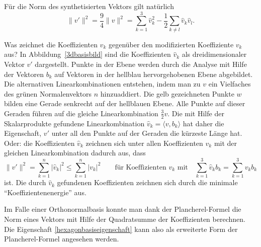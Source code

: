 Für die Norm des synthetisierten Vektors gilt natürlich
\[
\|v'\|^2
=
\frac94\|v\|^2
=
\sum_{k=1}^3 \hat{v}_k^2 
-
\frac12\sum_{k\ne l} \hat{v}_k\hat{v}_l.
\]

Was zeichnet die Koeffizienten $\hat{v}_k$ gegenüber den modifizierten
Koeffiziente $v_k$ aus?
In Abbildung~\ref{3dbasisbild} sind die Koeffizienten $\hat{v}_k$ als
dreidimensionaler Vektor $v'$ dargestellt.
Punkte in der Ebene werden durch die Analyse mit Hilfe der Vektoren $b_k$
auf Vektoren in der hellblau hervorgehobenen Ebene abgebildet.
Die alternativen Linearkombinationen entstehen, indem man zu $v$
ein Vielfaches des grünen Normalenvektors $n$ hinzuaddiert.
Die gelb gezeichneten Punkte $w$ bilden eine Gerade senkrecht
auf der hellblauen Ebene.
Alle Punkte auf dieser Geraden führen auf die gleiche
Linearkombination $\frac32v$.
Die mit Hilfe der Skalarprodukte gefundene Linearkombination
$\hat{v}_k=\langle v,b_k\rangle$ hat daher die Eigenschaft, 
$v'$ unter all den Punkte auf der Geraden die kürzeste Länge hat.
Oder: die Koeffizienten $\hat{v}_k$ zeichnen sich unter allen
Koeffizienten $v_k$ mit der gleichen Linearkombination dadurch aus, 
dass
\begin{equation}
\|v'\|^2
=
\sum_{k=1}^n |\hat{v}_k|^2
\le
\sum_{k=1}^n |v_k|^2
\qquad
\text{für Koeffizienten $v_k$ mit}
\quad
\sum_{k=1}^3 \hat{v}_kb_k
=
\sum_{k=1}^3 v_kb_k
\label{hexagonbasiseigenschaft}
\end{equation}
ist.
Die durch $\hat{v}_k$ gefundenen Koeffizienten zeichnen sich durch
die minimale ``Koeffizientenenergie'' aus.

Im Falle einer Orthonormalbasis konnte man dank der Plancherel-Formel
die Norm eines Vektors mit Hilfe der Quadratsumme der Koeffizienten
berechnen.
Die Eigenschaft \eqref{hexagonbasiseigenschaft} kann also als erweiterte
Form der Plancherel-Formel angesehen werden.

